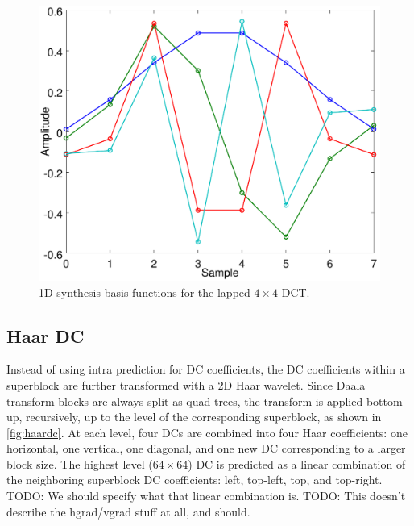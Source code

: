 \documentclass[english,conference,10pt]{IEEEtran}
\begin{document}
\begin{figure}
\centering
\includegraphics[width=0.8\columnwidth]{basis4}
\caption{1D synthesis basis functions for the lapped $4 \times 4$ DCT.\label{fig:basis4}}

\end{figure}

\subsection{Haar DC}

Instead of using intra prediction for DC coefficients, the DC coefficients
within a superblock are further transformed with a 2D Haar wavelet.
Since Daala transform blocks are always split as quad-trees, the transform is
applied bottom-up, recursively, up to the level of the corresponding superblock,
as shown in \cref{fig:haardc}.
At each level, four DCs are combined into four Haar coefficients: one horizontal,
one vertical, one diagonal, and one new DC corresponding to a larger block size.
The highest level ($64\times 64$) DC is predicted as a linear combination of the
neighboring superblock DC coefficients: left, top-left, top, and top-right.
TODO: We should specify what that linear combination is.
TODO: This doesn't describe the hgrad/vgrad stuff at all, and should.
\end{document}
